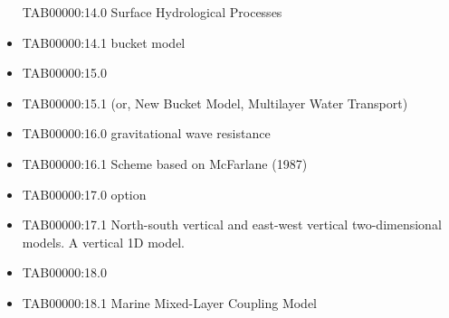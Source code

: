 \begin{itemize}
  TAB00000:14.0 Surface Hydrological Processes
\item
  TAB00000:14.1 bucket model
\item
  TAB00000:15.0
\item
  TAB00000:15.1 (or, New Bucket Model, Multilayer Water Transport)
\item
  TAB00000:16.0 gravitational wave resistance
\item
  TAB00000:16.1 Scheme based on McFarlane (1987)
\item
  TAB00000:17.0 option
\item
  TAB00000:17.1 North-south vertical and east-west vertical
  two-dimensional models. A vertical 1D model.
\item
  TAB00000:18.0
\item
  TAB00000:18.1 Marine Mixed-Layer Coupling Model
\end{itemize}
